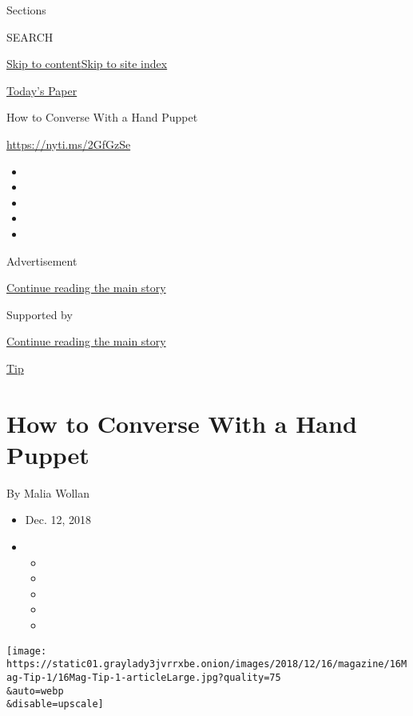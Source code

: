 Sections

SEARCH

\protect\hyperlink{site-content}{Skip to
content}\protect\hyperlink{site-index}{Skip to site index}

\href{https://myaccount.nytimes3xbfgragh.onion/auth/login?response_type=cookie\&client_id=vi}{}

\href{https://www.nytimes3xbfgragh.onion/section/todayspaper}{Today's
Paper}

How to Converse With a Hand Puppet

\url{https://nyti.ms/2GfGzSe}

\begin{itemize}
\item
\item
\item
\item
\item
\end{itemize}

Advertisement

\protect\hyperlink{after-top}{Continue reading the main story}

Supported by

\protect\hyperlink{after-sponsor}{Continue reading the main story}

\href{/column/magazine-tip}{Tip}

\hypertarget{how-to-converse-with-a-hand-puppet}{%
\section{How to Converse With a Hand
Puppet}\label{how-to-converse-with-a-hand-puppet}}

By Malia Wollan

\begin{itemize}
\item
  Dec. 12, 2018
\item
  \begin{itemize}
  \item
  \item
  \item
  \item
  \item
  \end{itemize}
\end{itemize}

\texttt{[image: https://static01.graylady3jvrrxbe.onion/images/2018/12/16/magazine/16Mag-Tip-1/16Mag-Tip-1-articleLarge.jpg?quality=75\\\&auto=webp\\\&disable=upscale]}

